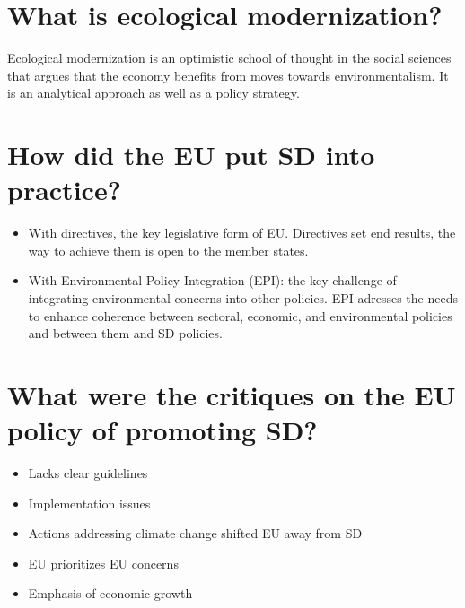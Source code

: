 \section{What is ecological modernization?}
Ecological modernization is an optimistic school of thought in the social sciences that argues that the economy benefits from moves towards environmentalism. It is an analytical approach as well as a policy strategy. 

\section{How did the EU put SD into practice?}
\begin{itemize}
\item With directives, the key legislative form of EU. Directives set end results, the way to achieve them is open to the member states.
\item With Environmental Policy Integration (EPI): the key challenge of integrating environmental concerns into other policies. EPI adresses the needs to enhance coherence between sectoral, economic, and environmental policies and between them and SD policies. 
\end{itemize}

\section{What were the critiques on the EU policy of promoting SD?}
\begin{itemize}
\item Lacks clear guidelines
\item Implementation issues
\item Actions addressing climate change shifted EU away from SD
\item EU prioritizes EU concerns
\item Emphasis of economic growth
\end{itemize}

